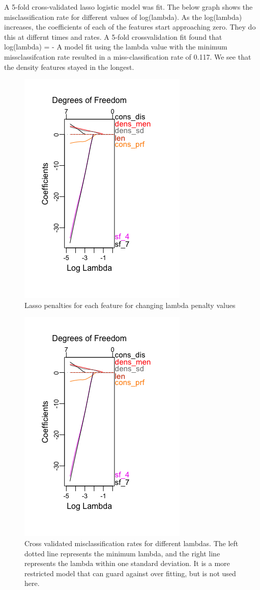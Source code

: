 \documentclass[12pt,twoside]{reedthesis}
\theoremstyle{definition}
\theoremstyle{definition}
\theoremstyle{definition}
\theoremstyle{remark}
\begin{document}
A 5-fold cross-validated lasso logistic model was fit. The below graph
shows the misclassification rate for different values of log(lambda). As
the log(lambda) increases, the coefficients of each of the features
start approaching zero. They do this at differnt times and rates. A
5-fold crossvalidation fit found that log(lambda) = - A model fit using
the lambda value with the minimum missclassifcation rate resulted in a
miss-classification rate of 0.117. We see that the density features
stayed in the longest.
\begin{figure}[h]
\centering
\includegraphics[scale = .5]{images/lasso_bach.png}
\caption{Lasso penalties for each feature for changing lambda penalty values}
\label{subd}
\end{figure}
\begin{figure}[h]
\centering
\includegraphics[scale = .5]{images/lasso_bach.png}
\caption{Cross validated misclassification rates for different lambdas. The left dotted line represents the minimum lambda, and the right line represents the lambda within one standard deviation. It is a more restricted model that can guard against over fitting, but is not used here.}
\label{subd}
\end{figure}
\end{document}
